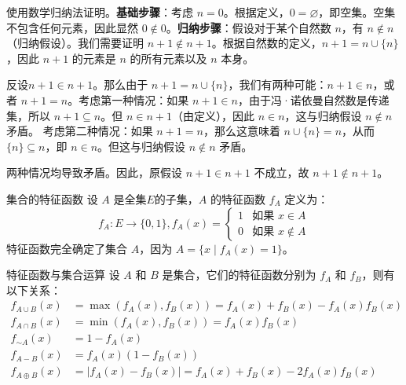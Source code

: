 \documentclass[lang=cn,11pt]{elegantbook}
\begin{document}
使用数学归纳法证明。\textbf{基础步骤}：考虑 $n = 0$。根据定义，$0 = \varnothing$，即空集。空集不包含任何元素，因此显然 $0 \notin 0$。\textbf{归纳步骤}：假设对于某个自然数 $n$，有 $n \notin n$（归纳假设）。我们需要证明 $n+1 \notin n+1$。根据自然数的定义，$n+1 = n \cup \{n\}$，因此 $n+1$ 的元素是 $n$ 的所有元素以及 $n$ 本身。

反设$n+1 \in n+1$。那么由于 $n+1 = n \cup \{n\}$，我们有两种可能：$n+1 \in n$，或者 $n+1 = n$。考虑第一种情况：如果 $n+1 \in n$，由于冯·诺依曼自然数是传递集，所以 $n+1 \subseteq n$。但 $n \in n+1$（由定义），因此 $n \in n$，这与归纳假设 $n \notin n$ 矛盾。
考虑第二种情况：如果 $n+1 = n$，那么这意味着 $n \cup \{n\} = n$，从而 $\{n\} \subseteq n$，即 $n \in n$。但这与归纳假设 $n \notin n$ 矛盾。

两种情况均导致矛盾。因此，原假设 $n+1 \in n+1$ 不成立，故 $n+1 \notin n+1$。
\begin{definition}{集合的特征函数}
设 $A$ 是全集$E$的子集，$A$ 的特征函数 $f_A$ 定义为：
\[
f_A:E\to\{0,1\},f_A(x) = 
\begin{cases}
1 & \text{如果 } x \in A \\
0 & \text{如果 } x \notin A
\end{cases}
\]
特征函数完全确定了集合 $A$，因为 $A = \{x \mid f_A(x) = 1\}$。
\end{definition}
\begin{theorem}{特征函数与集合运算}
设 $A$ 和 $B$ 是集合，它们的特征函数分别为 $f_A$ 和 $f_B$，则有以下关系：\vspace{-5pt}
\begin{align*}
f_{A \cup B}(x) &= \max(f_A(x), f_B(x)) = f_A(x) + f_B(x) - f_A(x)f_B(x) \\
f_{A \cap B}(x) &= \min(f_A(x), f_B(x)) = f_A(x)f_B(x) \\
f_{\sim A}(x) &= 1 - f_A(x) \\
f_{A -B}(x) &= f_A(x)(1 - f_B(x)) \\
f_{A \oplus B}(x) &= |f_A(x) - f_B(x)| = f_A(x) + f_B(x) - 2f_A(x)f_B(x)
\end{align*}
\end{theorem}
\end{document}
